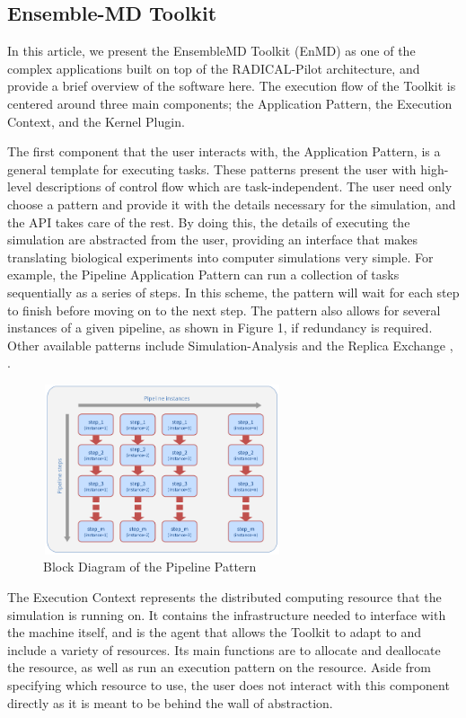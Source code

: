 \documentclass[]{article}
\begin{document}
		\subsection{Ensemble-MD Toolkit} 
			In this article, we present the EnsembleMD Toolkit (EnMD) as one of the complex applications built on top of the RADICAL-Pilot architecture, and provide a brief overview of the software here. The execution flow of the Toolkit is centered around three main components; the Application Pattern, the Execution Context, and the Kernel Plugin. 


			The first component that the user interacts with, the Application Pattern, is a general template for executing tasks. These patterns present the user with high-level descriptions of control flow which are task-independent. The user need only choose a pattern and provide it with the details necessary for the simulation, and the API takes care of the rest. By doing this, the details of executing the simulation are abstracted from the user, providing an interface that makes translating biological experiments into computer simulations very simple. For example, the Pipeline Application Pattern can run a collection of tasks sequentially as a series of steps. In this scheme, the pattern will wait for each step to finish before moving on to the next step. The pattern also allows for several instances of a given pipeline, as shown in Figure 1, if redundancy is required. Other available patterns include Simulation-Analysis and the Replica Exchange \cite{enmd_paper}, \cite{repex_paper}.

			\begin{figure}[H]
				\centering
				\includegraphics[width=7cm,height=5cm]{diagrams/pipeline_pattern}
				\caption{Block Diagram of the Pipeline Pattern \cite{pipeline_pattern}}
				\label{fig:pipeline_block_diagram}
			\end{figure}

			The Execution Context represents the distributed computing resource that the simulation is running on. It contains the infrastructure needed to interface with the machine itself, and is the agent that allows the Toolkit to adapt to and include a variety of resources. Its main functions are to allocate and deallocate the resource, as well as run an execution pattern on the resource. Aside from specifying which resource to use, the user does not interact with this component directly as it is meant to be behind the wall of abstraction. 
\end{document}
